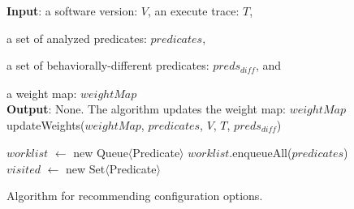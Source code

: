 
\begin{figure}[t]
\textbf{Input}: a software version: $\mathit{V}$, an execute trace: $\mathit{T}$, 

\quad a set of analyzed predicates: $\mathit{predicates}$, 

\quad a set of behaviorally-different predicates: $\mathit{preds_{diff}}$, and

\quad a weight map: $\mathit{weightMap}$\\
\textbf{Output}: None. The algorithm updates the weight map: $\mathit{weightMap}$\\
\vspace{-4mm}%
updateWeights($\mathit{weightMap}$, $\mathit{predicates}$, $\mathit{V}$, $\mathit{T}$, $\mathit{preds_{diff}}$)\\
\begin{algorithmic}[1]
\STATE $\mathit{worklist}$ $\leftarrow$ new Queue$\langle$Predicate$\rangle$
\STATE $\mathit{worklist}$.enqueueAll($\mathit{predicates}$)
\STATE $\mathit{visited}$ $\leftarrow$ new Set$\langle$Predicate$\rangle$
\vspace{-2mm}
\end{algorithmic}
\caption{Algorithm for recommending configuration options.
\label{fig:recommend}
}
\end{figure}
